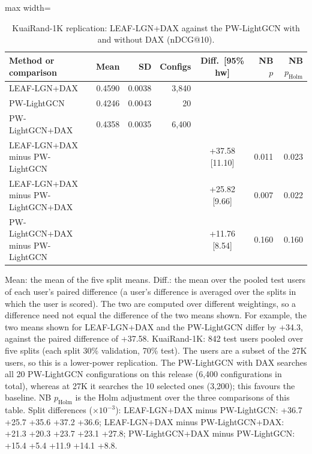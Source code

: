 \begin{table}[tbp]
\centering
\footnotesize
\caption{KuaiRand-1K replication: LEAF-LGN+DAX against the PW-LightGCN with and without DAX (nDCG@10).}
\label{tab:1k}
\begin{adjustbox}{max width=\linewidth}
\begin{tabular}{lrrrcrr}
\toprule
Method or comparison & Mean & SD & Configs & Diff.\ [95\% hw] & NB $p$ & NB $p_{\mathrm{Holm}}$ \\
\midrule
LEAF-LGN+DAX & 0.4590 & 0.0038 & 3,840 &  &  &  \\
PW-LightGCN & 0.4246 & 0.0043 & 20 &  &  &  \\
PW-LightGCN+DAX & 0.4358 & 0.0035 & 6,400 &  &  &  \\
\midrule
LEAF-LGN+DAX minus PW-LightGCN &  &  &  & +37.58 [11.10] & 0.011 & 0.023 \\
LEAF-LGN+DAX minus PW-LightGCN+DAX &  &  &  & +25.82 [9.66] & 0.007 & 0.022 \\
PW-LightGCN+DAX minus PW-LightGCN &  &  &  & +11.76 [8.54] & 0.160 & 0.160 \\
\bottomrule
\end{tabular}
\end{adjustbox}
\par\smallskip
\begin{minipage}{\linewidth}\raggedright\footnotesize Mean: the mean of the five split means. Diff.: the mean over the pooled test users of each user's paired difference (a user's difference is averaged over the splits in which the user is scored). The two are computed over different weightings, so a difference need not equal the difference of the two means shown. For example, the two means shown for LEAF-LGN+DAX and the PW-LightGCN differ by +34.3, against the paired difference of +37.58. KuaiRand-1K: 842 test users pooled over five splits (each split 30\% validation, 70\% test). The users are a subset of the 27K users, so this is a lower-power replication. The PW-LightGCN with DAX searches all 20 PW-LightGCN configurations on this release (6,400 configurations in total), whereas at 27K it searches the 10 selected ones (3,200); this favours the baseline. NB $p_{\mathrm{Holm}}$ is the Holm adjustment over the three comparisons of this table. Split differences ($\times10^{-3}$): LEAF-LGN+DAX minus PW-LightGCN: +36.7 +25.7 +35.6 +37.2 +36.6; LEAF-LGN+DAX minus PW-LightGCN+DAX: +21.3 +20.3 +23.7 +23.1 +27.8; PW-LightGCN+DAX minus PW-LightGCN: +15.4 +5.4 +11.9 +14.1 +8.8.\end{minipage}
\end{table}
